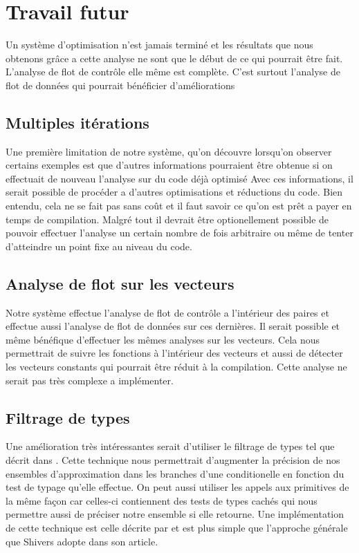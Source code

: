 \clearpage

\section{Travail futur}

Un système d'optimisation n'est jamais terminé et les résultats que
nous obtenons grâce a cette analyse ne sont que le début de ce qui
pourrait être fait. L'analyse de flot de contrôle elle même est
complète.  C'est surtout l'analyse de flot de données qui pourrait
bénéficier d'améliorations

\subsection{Multiples itérations}

Une première limitation de notre système, qu'on découvre lorsqu'on
observer certains exemples est que d'autres informations pourraient être
obtenue si on effectuait de nouveau l'analyse sur du code déjà optimisé
Avec ces informations, il serait possible de procéder a d'autres optimisations
et réductions du code. Bien entendu, cela ne se fait pas sans coût et il
faut savoir ce qu'on est prêt a payer en temps de compilation. Malgré tout
il devrait être optionellement possible de pouvoir effectuer l'analyse
un certain nombre de fois arbitraire ou même de tenter d'atteindre un point
fixe au niveau du code.

\subsection{Analyse de flot sur les vecteurs}

Notre système effectue l'analyse de flot de contrôle a l'intérieur des paires
et effectue aussi l'analyse de flot de données sur ces dernières. Il serait
possible et même bénéfique d'effectuer les mêmes analyses sur les vecteurs.
Cela nous permettrait de suivre les fonctions à l'intérieur des vecteurs
et aussi de détecter les vecteurs constants qui pourrait être réduit à
la compilation. Cette analyse ne serait pas très complexe a implémenter.

\subsection{Filtrage de types}

Une amélioration très intéressantes serait d'utiliser le
filtrage de types tel que décrit dans \cite{shivers88}.  Cette
technique nous permettrait d'augmenter la précision de nos ensembles
d'approximation dans les branches d'une conditionelle en fonction du
test de typage qu'elle effectue. On peut aussi utiliser les appels aux
primitives de la même façon car celles-ci contiennent des tests de
types cachés qui nous permettre aussi de préciser notre ensemble si
elle retourne. Une implémentation de cette technique est celle décrite
par \cite{boucher2000} et est plus simple que l'approche générale que
Shivers adopte dans son article.

